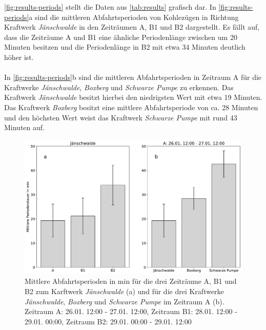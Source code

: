 \autoref{fig:results-periods} stellt die Daten aus \autoref{tab:results} grafisch dar. In \autoref{fig:results-periods}a sind die mittleren Abfahrtsperioden von Kohlezügen in Richtung Kraftwerk \emph{Jänschwalde} in den Zeiträumen A, B1 und B2 dargestellt. Es fällt auf, dass die Zeiträume A und B1 eine ähnliche Periodenlänge zwischen um 20 Minuten besitzen und die Periodenlänge in B2 mit etwa 34 Minuten deutlich höher ist.\\
\\
In \autoref{fig:results-periods}b sind die mittleren Abfahrtsperioden in Zeitraum A für die Kraftwerke \emph{Jänschwalde}, \emph{Boxberg} und \emph{Schwarze Pumpe} zu erkennen. Das Kraftwerk \emph{Jänschwalde} besitzt hierbei den niedrigsten Wert mit etwa 19 Minuten. Das Kraftwerk \emph{Boxberg} besitzt eine mittlere Abfahrtsperiode von ca. 28 Minuten und den höchsten Wert weist das Kraftwerk \emph{Schwarze Pumpe} mit rund 43 Minuten auf.

\begin{figure}[!ht]
	\centering
	\includegraphics[width=1.0\linewidth]{images/results/periods.pdf}
	\caption{Mittlere Abfahrtsperioden in min für die drei Zeiträume A, B1 und B2 zum Karftwerk \emph{Jänschwalde} (a) und für die drei Kraftwerke \emph{Jänschwalde}, \emph{Boxberg} und \emph{Schwarze Pumpe} im Zeitraum A (b). Zeitraum A: 26.01. 12:00 - 27.01. 12:00, Zeitraum B1: 28.01. 12:00 - 29.01. 00:00, Zeitraum B2: 29.01. 00:00 - 29.01. 12:00}
	\label{fig:results-periods}
\end{figure}


